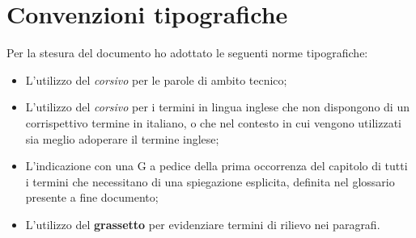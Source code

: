 
{}
{}
\begingroup
\let\clearpage\relax
\let\cleardoublepage\relax
\let\cleardoublepage\relax

\chapter{Convenzioni tipografiche}

Per la stesura del documento ho adottato le seguenti norme tipografiche:\\

\begin{itemize}
	\item L'utilizzo del \textit{corsivo} per le parole di ambito tecnico;
	\item L'utilizzo del \textit{corsivo} per i termini in lingua inglese che non dispongono di un corrispettivo termine in italiano, o che nel contesto in cui vengono utilizzati sia meglio adoperare il termine inglese; 
	\item L'indicazione con una G a pedice della prima occorrenza del capitolo di tutti i termini che necessitano di una spiegazione esplicita, definita nel glossario presente a fine documento;
	\item L'utilizzo del \textbf{grassetto} per evidenziare termini di rilievo nei paragrafi.
\end{itemize}



%
%

\endgroup			


